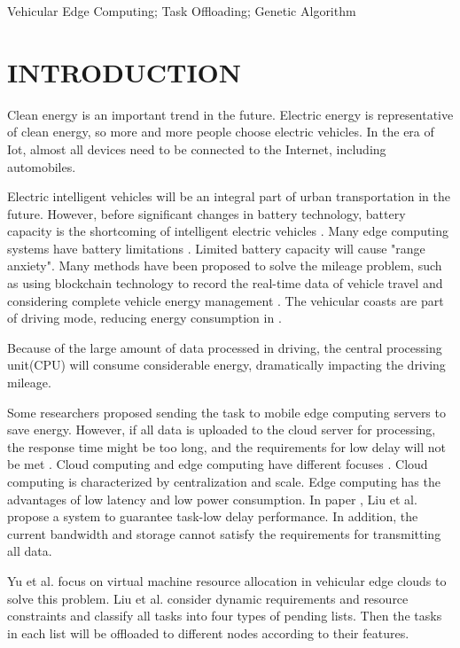 \documentclass[conference]{IEEEtran}
\begin{document}
	\begin{IEEEkeywords}
		Vehicular Edge Computing; Task Offloading; Genetic Algorithm
	\end{IEEEkeywords}
	
	\section{INTRODUCTION}
	Clean energy is an important trend in the future. Electric energy is representative of clean energy, so more and more people choose electric vehicles. In the era of Iot, almost all devices need to be connected to the Internet, including automobiles. 
	
	Electric intelligent vehicles will be an integral part of urban transportation in the future. However, before significant changes in battery technology, battery capacity is the shortcoming of intelligent electric vehicles \cite{battery}. Many edge computing systems have battery limitations \cite{zhang2022local}. 
	Limited battery capacity will cause "range anxiety". 
	Many methods have been proposed to solve the mileage problem, such as using blockchain technology to record the real-time data of vehicle travel \cite{zhang2022truthful} and considering complete vehicle energy management \cite{complete}. The vehicular coasts are part of driving mode, reducing energy consumption in \cite{coast}. 
	
	Because of the large amount of data processed in driving, the central processing unit(CPU) will consume considerable energy, dramatically impacting the driving mileage. 
	
	Some researchers proposed sending the task to mobile edge computing servers to save energy. 
	However, if all data is uploaded to the cloud server for processing, the response time might be too long, and the requirements for low delay will not be met \cite{2021v2mec}. 
	Cloud computing and edge computing have different focuses \cite{zhang2022strategy}. Cloud computing is characterized by centralization and scale. Edge computing has the advantages of low latency and low power consumption. 
	In paper \cite{edgeserver}, Liu et al. propose a system to guarantee task-low delay performance. 
	In addition, the current bandwidth and storage cannot satisfy the requirements for transmitting all data. 
	
	Yu et al. \cite{yu2013toward} focus on virtual machine resource allocation in vehicular edge clouds to solve this problem. 
	Liu et al. \cite{liu2020fourtypes} consider dynamic requirements and resource constraints and classify all tasks into four types of pending lists. Then the tasks in each list will be offloaded to different nodes according to their features. 
	
\end{document}
